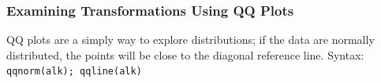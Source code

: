 \documentclass[10pt]{beamer}
\begin{document}
\begin{frame}[fragile]
\frametitle{Examining Transformations Using QQ Plots}
\begin{center}
\end{center}
\vspace{-2ex} 

{\scriptsize QQ plots are a simply way to explore distributions; if
  the data are normally distributed, the points will be close to the
  diagonal reference line. Syntax: {\color{red} \tt qqnorm(alk);
    qqline(alk)} \\}
\end{frame}
\end{document}
